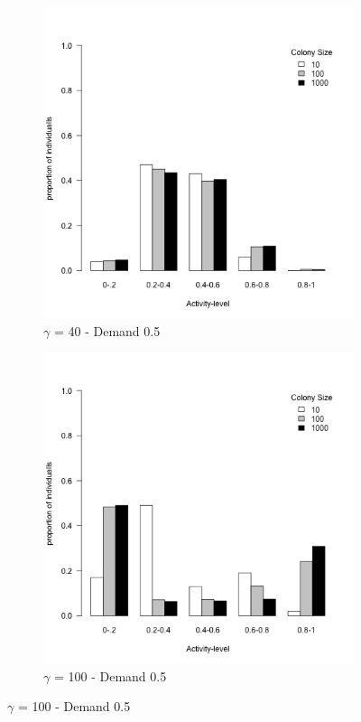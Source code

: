 \documentclass[a4paper]{article}
\begin{document}
\begin{figure}[!ht]
    \begin{subfigure}[b]{0.45\linewidth}
      \includegraphics[width=\linewidth]{Boredom_40_and_5}
      \caption{$\gamma$ = 40 - Demand 0.5}\label{fig:3a}
    \end{subfigure}
    \hfill
    \begin{subfigure}[b]{0.45\linewidth}
      \includegraphics[width=\linewidth]{Boredom_100_and_5}
      \caption{$\gamma$ = 100 - Demand 0.5}\label{fig:3b}
     \end{subfigure}
     

\end{figure}
\end{document}
